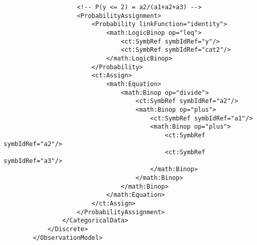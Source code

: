 \begin{lstlisting}
                    <!-- P(y <= 2) = a2/(a1+a2+a3) -->
                    <ProbabilityAssignment>
                        <Probability linkFunction="identity">
                            <math:LogicBinop op="leq">
                                <ct:SymbRef symbIdRef="y"/>
                                <ct:SymbRef symbIdRef="cat2"/>
                            </math:LogicBinop>
                        </Probability>
                        <ct:Assign>
                            <math:Equation>
                                <math:Binop op="divide">
                                    <ct:SymbRef symbIdRef="a2"/>
                                    <math:Binop op="plus">
                                        <ct:SymbRef symbIdRef="a1"/>
                                        <math:Binop op="plus">
                                            <ct:SymbRef symbIdRef="a2"/>
                                            <ct:SymbRef symbIdRef="a3"/>
                                        </math:Binop>
                                    </math:Binop>
                                </math:Binop>
                            </math:Equation>
                        </ct:Assign>
                    </ProbabilityAssignment>
                </CategoricalData>
            </Discrete>
        </ObservationModel>
\end{lstlisting}


%
%
%



